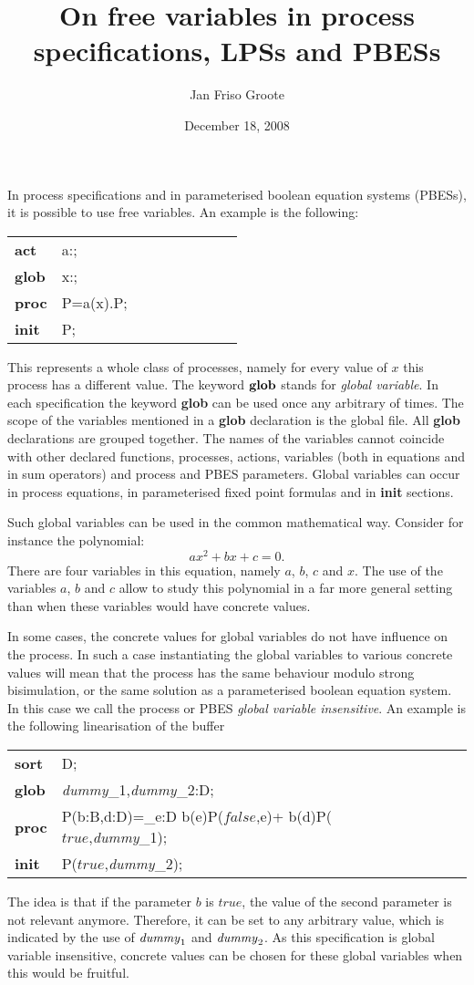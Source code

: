 \documentclass{article}
\author{Jan Friso Groote}
\title{On free variables in process specifications, LPSs and PBESs}
\date{December 18, 2008}
\makeatletter
\newcommand{\ap}{{:}}
\newcommand{\Bool}{{\mathbb B}}
\newcommand{\Nat}{\mathbb{N}}
\newcommand{\true}{\ensuremath{\mathit{true}}}
\newcommand{\false}{\ensuremath{\mathit{false}}}
\newenvironment{mcrl2}%
{\begin{trivlist}
\item\begin{tabular}{@{}>{\bf}p{2.3em}L@{\ }L@{\ }L@{\ }L@{\ }L@{\ }L@{\ }L@{\ }L}}%
{\end{tabular}\end{trivlist}}
\makeatother
\begin{document}
\maketitle
\noindent
In process specifications and in parameterised boolean equation systems (PBESs), it is
possible to use free variables. An example is the following:
\begin{mcrl2}
act  & a:\Nat;\\
glob & x:\Nat;\\
proc & P=a(x).P;\\
init & P;
\end{mcrl2}
This represents a whole class of processes, namely for every value of
$x$ this process has a different value. The keyword ${\bf glob}$ stands
for {\it global variable}.
In each specification the keyword {\bf glob} can
be used once any arbitrary of times. The scope of the variables
mentioned in a {\bf glob} declaration is the global file. All {\bf glob}
declarations are grouped together. The names of the variables cannot coincide with other
declared functions, processes, actions, variables (both in equations and
in sum operators) and process and PBES parameters.
Global variables can occur in
process equations, in parameterised fixed point formulas and in {\bf init}
sections.

Such global variables can be used in the common mathematical way. Consider
for instance the polynomial:
\[ax^2+bx+c=0.\]
There are four variables in this equation, namely $a$, $b$, $c$ and $x$.
The use of the variables $a$, $b$ and $c$ allow to study this polynomial in
a far more general setting than when these variables would have concrete values.

In some cases, the concrete values for global variables do not have influence
on the process. In such a case instantiating the global variables to various concrete
values will mean that the process has the same behaviour modulo strong bisimulation,
or the same solution as a parameterised boolean equation system. In this case
we call the process or PBES {\it global variable insensitive}.
An example is the following linearisation of the buffer
\begin{mcrl2}
sort & D;\\
glob & {\it dummy}_1,{\it dummy}_2:D;\\
proc& P(b:\Bool,d\ap D)=\sum_{e\ap D} b(e){\it \cdot}P(\false,e)+
\neg b(d){\cdot}P(\true,{\it dummy}_1);\\
init& P(\true,{\it dummy}_2);
\end{mcrl2}
The idea is that if the parameter $b$ is $\true$, the value of the second parameter
is not relevant anymore. Therefore, it can be set to any arbitrary value, which is
indicated by the use of ${\it dummy}_1$ and ${\it dummy}_2$. As this specification is
global variable insensitive, concrete values can be chosen for these global variables
when this would be fruitful.
\end{document}
